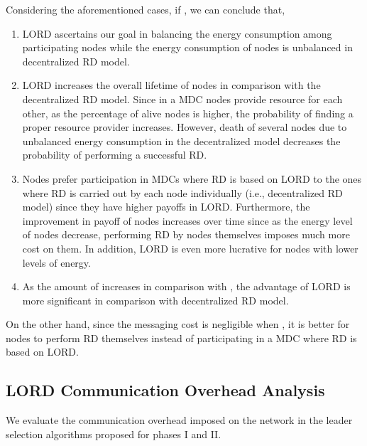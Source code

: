 \documentclass[journal,12pt, onecolumn]{IEEEtran}
\begin{document}
Considering the aforementioned cases, if , we can conclude that,
\begin{enumerate}
\item LORD ascertains our goal in balancing the energy consumption among participating nodes while the energy consumption of nodes is unbalanced in decentralized RD model.
\item LORD increases the overall lifetime of nodes in comparison with the decentralized RD model. Since in a MDC nodes provide resource for each other, as the percentage of alive nodes is higher, the probability of finding a proper resource provider increases. However, death of several nodes due to unbalanced energy consumption in the decentralized model decreases the probability of performing a successful RD.
\item Nodes prefer participation in MDCs where RD is based on LORD to the ones where RD is carried out by each node individually (i.e., decentralized RD model) since they have higher payoffs in LORD. Furthermore, the improvement in payoff of nodes increases over time since as the energy level of nodes decrease, performing RD by nodes themselves imposes much more cost on them. In addition, LORD is even more lucrative for nodes with lower levels of energy.

\item As the amount of  increases in comparison with , the advantage of LORD is more significant in comparison with decentralized RD model.  
\end{enumerate}

On the other hand, since the messaging cost is negligible when , it is better for nodes to perform RD themselves instead of participating in a MDC where RD is based on LORD.

\subsection{LORD Communication Overhead Analysis}
We evaluate the communication overhead imposed on the network in the leader selection algorithms proposed for phases I and II. 
\end{document}
